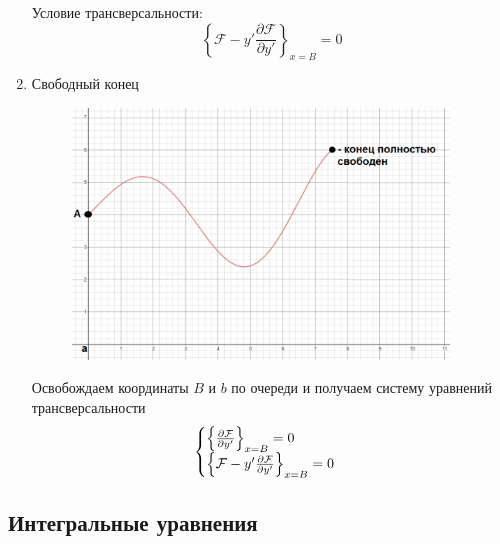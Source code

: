 \begin{enumerate}
      Условие трансверсальности:
      $$\left\{\mathcal{F}-y'\frac{\partial\mathcal{F}}{\partial y'}\right\}_{x=B}=0$$
      
    \item Свободный конец\\
    
    \begin{figure}[h!]
        \begin{center}
          \includegraphics[width = 10cm]{Math/h.png}
        \end{center}
    \end{figure}
    
    Освобождаем координаты $B$ и $b$ по очереди и получаем систему уравнений трансверсальности
    \begin{equation*}
        \begin{cases}
          $$\left\{\frac{\partial\mathcal{F}}{\partial y'}\right\}_{x=B}=0$$\\
          $$\left\{\mathcal{F}-y'\frac{\partial\mathcal{F}}{\partial y'}\right\}_{x=B}=0$$
        \end{cases}
      \end{equation*}
\end{enumerate}




\subsection{Интегральные уравнения}
